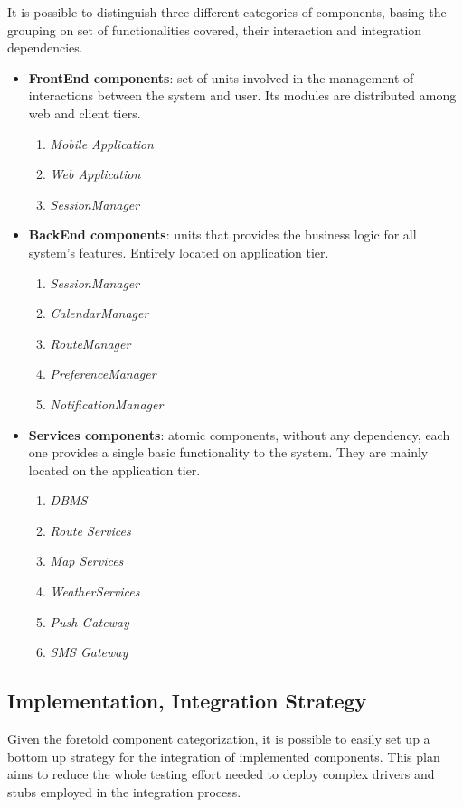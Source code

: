It is possible to distinguish three different categories of components, basing the grouping on set of functionalities covered, their interaction and integration dependencies.
\vspace{0.3cm}
\begin{itemize}
	\item \textbf{FrontEnd components}: set of units involved in the management of interactions between the system and user. Its modules are distributed among web and client tiers.
	\begin{enumerate}
		\item \textit{Mobile Application}
		\item \textit{Web Application}
		\item \textit{SessionManager}
	\end{enumerate}
	\item \textbf{BackEnd components}: units that provides the business logic for all system's features. Entirely located on application tier.
	\begin{enumerate}
		\item \textit{SessionManager}
		\item \textit{CalendarManager}
		\item \textit{RouteManager}
		\item \textit{PreferenceManager}
		\item \textit{NotificationManager}
	\end{enumerate}
	\item \textbf{Services components}: atomic components, without any dependency, each one provides a single basic functionality to the system. They are mainly located on the application tier.
	\begin{enumerate}
		\item \textit{DBMS}
		\item \textit{Route Services}
		\item \textit{Map Services}
		\item \textit{WeatherServices}
		\item \textit{Push Gateway}
		\item \textit{SMS Gateway}
	\end{enumerate}
\end{itemize}
\subsection{Implementation, Integration Strategy}

Given the foretold component categorization, it is possible to easily set up a bottom up strategy for the integration of implemented components. This plan aims to reduce the whole testing effort needed to deploy complex drivers and stubs employed in the integration process.

